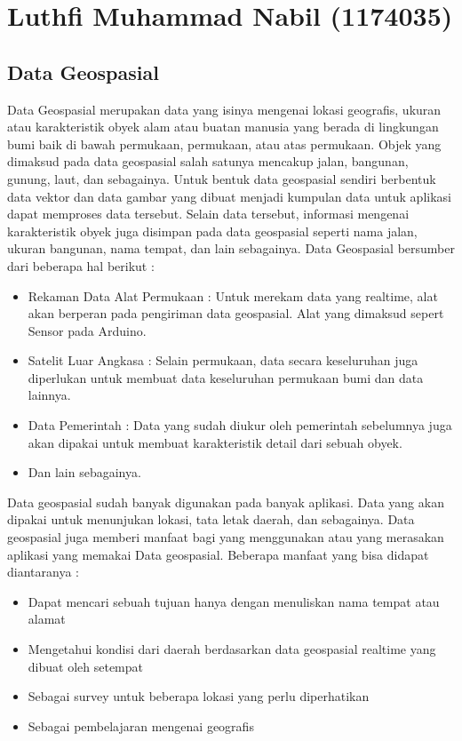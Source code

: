 \section{Luthfi Muhammad Nabil (1174035)}
\subsection{Data Geospasial}
Data Geospasial merupakan data yang isinya mengenai lokasi geografis, ukuran atau karakteristik obyek alam atau buatan manusia yang berada di lingkungan bumi baik di bawah permukaan, permukaan, atau atas permukaan. Objek yang dimaksud pada data geospasial salah satunya mencakup jalan, bangunan, gunung, laut, dan sebagainya. Untuk bentuk data geospasial sendiri berbentuk data vektor dan data gambar yang dibuat menjadi kumpulan data untuk aplikasi dapat memproses data tersebut. Selain data tersebut, informasi mengenai karakteristik obyek juga disimpan pada data geospasial seperti nama jalan, ukuran bangunan, nama tempat, dan lain sebagainya.
\break
Data Geospasial bersumber dari beberapa hal berikut : 
\begin{itemize}
	\item Rekaman Data Alat Permukaan : Untuk merekam data yang realtime, alat akan berperan pada pengiriman data geospasial. Alat yang dimaksud sepert Sensor pada Arduino.
	\item Satelit Luar Angkasa : Selain permukaan, data secara keseluruhan juga diperlukan untuk membuat data keseluruhan permukaan bumi dan data lainnya. 
	\item Data Pemerintah : Data yang sudah diukur oleh pemerintah sebelumnya juga akan dipakai untuk membuat karakteristik detail dari sebuah obyek. 
	\item Dan lain sebagainya.
\end{itemize}
Data geospasial sudah banyak digunakan pada banyak aplikasi. Data yang akan dipakai untuk menunjukan lokasi, tata letak daerah, dan sebagainya. Data geospasial juga memberi manfaat bagi yang menggunakan atau yang merasakan aplikasi yang memakai Data geospasial. Beberapa manfaat yang bisa didapat diantaranya : 
\begin{itemize}
	\item Dapat mencari sebuah tujuan hanya dengan menuliskan nama tempat atau alamat
	\item Mengetahui kondisi dari daerah berdasarkan data geospasial realtime yang dibuat oleh setempat
	\item Sebagai survey untuk beberapa lokasi yang perlu diperhatikan
	\item Sebagai pembelajaran mengenai geografis
\end{itemize}
